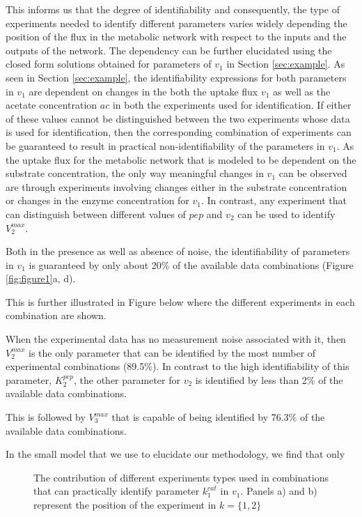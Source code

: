 \documentclass[10pt]{article}
\begin{document}
This informs us that the degree of identifiability and consequently, the type of experiments needed to identify different parameters varies widely depending the position of the flux in the metabolic network with respect to the inputs and the outputs of the network. The dependency can be further elucidated using the closed form solutions obtained for parameters of $v_1$ in Section \ref{sec:example}. As seen in Section \ref{sec:example}, the identifiability expressions for both parameters in $v_1$ are dependent on changes in the both the uptake flux $v_1$ as well as the acetate concentration $ac$ in both the experiments used for identification. If either of these values cannot be distinguished between the two experiments whose data is used for identification, then the corresponding combination of experiments can be guaranteed to result in practical non-identifiability of the parameters in $v_1$. As the uptake flux for the metabolic network that is modeled to be dependent on the substrate concentration, the only way meaningful changes in $v_1$ can be observed are through experiments involving changes either in the substrate concentration or changes in the enzyme concentration for $v_1$.
In contrast, any experiment that can distinguish between different values of $pep$ and $v_2$ can be used to identify $V_2^{max}$. 




Both in the presence as well as absence of noise, the identifiability of parameters in $v_1$ is guaranteed by only about 20\% of the available data combinations (Figure \ref{fig:figure1}a, d). 

 This is further illustrated in Figure below where the different experiments in each combination are shown.



When the experimental data has no measurement noise associated with it, then $V_2^{max}$ is the only parameter that can be identified by the most number of experimental combinations (89.5\%). In contrast to the high identifiability of this parameter, $K_2^{pep}$, the other parameter for $v_2$ is identified by less than 2\% of the available data combinations.

This is followed by $V_3^{max}$ that is capable of being identified by 76.3\% of the available data combinations. 

In the small model that we use to elucidate our methodology, we find that only 

\begin{figure}[!tbhp]
	\caption{The contribution of different experiments types used in combinations that can practically identify parameter $k_1^{cat}$ in $v_1$. Panels a) and b) represent the position of the experiment in $k = \{1, 2\}$}\label{fig:figure2}
\end{figure}
\end{document}
